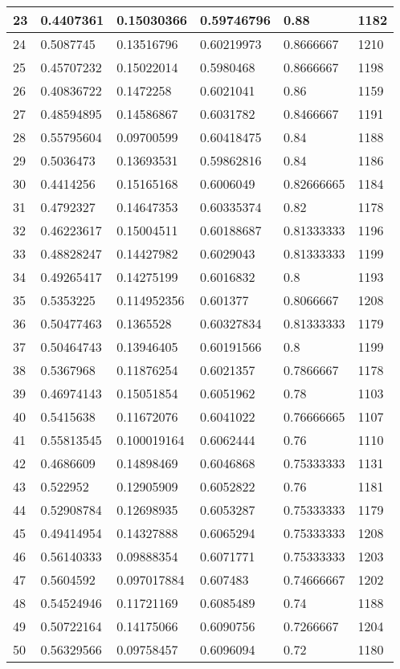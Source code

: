 \begin{longtable}{|l|l|l|l|l|l|}
23 & 0.4407361 & 0.15030366 & 0.59746796 & 0.88 & 1182 \\ \hline 
24 & 0.5087745 & 0.13516796 & 0.60219973 & 0.8666667 & 1210 \\ \hline 
25 & 0.45707232 & 0.15022014 & 0.5980468 & 0.8666667 & 1198 \\ \hline 
26 & 0.40836722 & 0.1472258 & 0.6021041 & 0.86 & 1159 \\ \hline 
27 & 0.48594895 & 0.14586867 & 0.6031782 & 0.8466667 & 1191 \\ \hline 
28 & 0.55795604 & 0.09700599 & 0.60418475 & 0.84 & 1188 \\ \hline 
29 & 0.5036473 & 0.13693531 & 0.59862816 & 0.84 & 1186 \\ \hline 
30 & 0.4414256 & 0.15165168 & 0.6006049 & 0.82666665 & 1184 \\ \hline 
31 & 0.4792327 & 0.14647353 & 0.60335374 & 0.82 & 1178 \\ \hline 
32 & 0.46223617 & 0.15004511 & 0.60188687 & 0.81333333 & 1196 \\ \hline 
33 & 0.48828247 & 0.14427982 & 0.6029043 & 0.81333333 & 1199 \\ \hline 
34 & 0.49265417 & 0.14275199 & 0.6016832 & 0.8 & 1193 \\ \hline 
35 & 0.5353225 & 0.114952356 & 0.601377 & 0.8066667 & 1208 \\ \hline 
36 & 0.50477463 & 0.1365528 & 0.60327834 & 0.81333333 & 1179 \\ \hline 
37 & 0.50464743 & 0.13946405 & 0.60191566 & 0.8 & 1199 \\ \hline 
38 & 0.5367968 & 0.11876254 & 0.6021357 & 0.7866667 & 1178 \\ \hline 
39 & 0.46974143 & 0.15051854 & 0.6051962 & 0.78 & 1103 \\ \hline 
40 & 0.5415638 & 0.11672076 & 0.6041022 & 0.76666665 & 1107 \\ \hline 
41 & 0.55813545 & 0.100019164 & 0.6062444 & 0.76 & 1110 \\ \hline 
42 & 0.4686609 & 0.14898469 & 0.6046868 & 0.75333333 & 1131 \\ \hline 
43 & 0.522952 & 0.12905909 & 0.6052822 & 0.76 & 1181 \\ \hline 
44 & 0.52908784 & 0.12698935 & 0.6053287 & 0.75333333 & 1179 \\ \hline 
45 & 0.49414954 & 0.14327888 & 0.6065294 & 0.75333333 & 1208 \\ \hline 
46 & 0.56140333 & 0.09888354 & 0.6071771 & 0.75333333 & 1203 \\ \hline 
47 & 0.5604592 & 0.097017884 & 0.607483 & 0.74666667 & 1202 \\ \hline 
48 & 0.54524946 & 0.11721169 & 0.6085489 & 0.74 & 1188 \\ \hline 
49 & 0.50722164 & 0.14175066 & 0.6090756 & 0.7266667 & 1204 \\ \hline 
50 & 0.56329566 & 0.09758457 & 0.6096094 & 0.72 & 1180 \\ \hline 
\end{longtable}